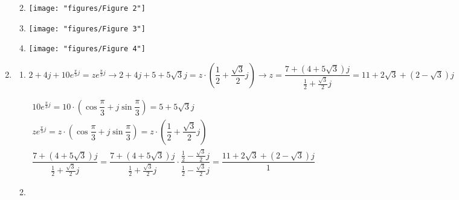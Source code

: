 \begin{enumerate}[label=\color{red}\textbf{\arabic*)}]
\begin{enumerate}[label=\color{red}\textbf{\alph*)}]
\begin{center}
            \end{center}
            \item {} 
                \begin{center}
                \texttt{[image: "figures/Figure 2"]}
            \end{center}
            \item {} 
                \begin{center}
                \texttt{[image: "figures/Figure 3"]}
            \end{center}
            \item {} 
                \begin{center}
                \texttt{[image: "figures/Figure 4"]}
            \end{center}
        \end{enumerate}
    \item {}
        \begin{enumerate}[label=\color{red}\textbf{\alph*)}]
            \item {} 

                $2+4j+10e^{\frac{\pi}{3} j} =ze^{\frac{\pi}{3}j}\longrightarrow 2+4j+5+5\sqrt{3} j=z\cdot \left( \dfrac{1}{2}+\dfrac{\sqrt{3} }{2}j \right)\longrightarrow z=\dfrac{7+(4+5\sqrt{3} )j}{\frac{1}{2}+\frac{\sqrt{3} }{2} j } = 11+2\sqrt{3} +(2-\sqrt{3} )j$ 

                $\begin{array}{l}
                    10e^{\frac{\pi}{3} j} =10\cdot\left( \cos\dfrac{\pi}{3}+j\sin\dfrac{\pi}{3} \right) =5+5\sqrt{3} j\\
                    ze^{\frac{\pi}{3} j}=z\cdot \left( \cos\dfrac{\pi}{3}+j\sin\dfrac{\pi}{3} \right) =z\cdot \left( \dfrac{1}{2}+\dfrac{\sqrt{3} }{2}j \right)  \\
                    \dfrac{7+(4+5\sqrt{3} )j}{\frac{1}{2}+\frac{\sqrt{3} }{2} j }=\dfrac{7+(4+5\sqrt{3} )j}{\frac{1}{2}+\frac{\sqrt{3} }{2} j }\cdot \dfrac{\frac{1}{2}-\frac{\sqrt{3}}{2}j  }{\frac{1}{2} -\frac{\sqrt{3} }{2} j}=\dfrac{11+2\sqrt{3} +(2-\sqrt{3} )j}{1}
                \end{array}$
            \item {} 


\end{enumerate}
\end{enumerate}
